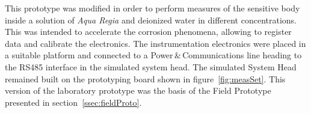 \documentclass[journal,twoside,web]{ieeecolor}
\begin{document}
This prototype was modified in order to perform measures of the sensitive body inside a solution of \textit{Aqua Regia} and deionized water in different concentrations. This was intended to accelerate the corrosion phenomena, allowing to register data and calibrate the electronics. %
The instrumentation electronics were placed in a suitable platform and connected to a Power\,$\&$\,Communications line heading to the RS485 interface in the simulated system head. The simulated System Head remained built on the prototyping board shown in figure~\ref{fig:measSet}. This version of the laboratory prototype was the basis of the Field Prototype presented in section~\ref{ssec:fieldProto}.
\end{document}
